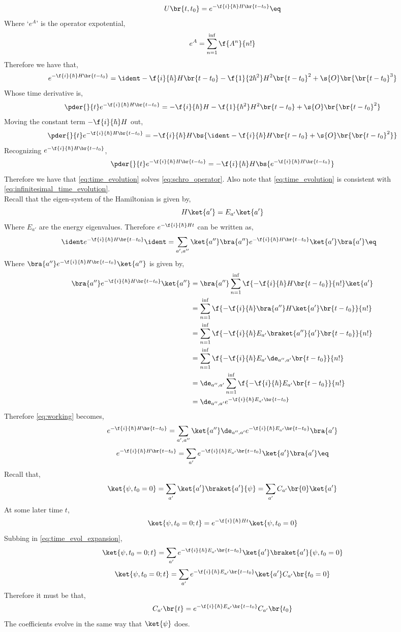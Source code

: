 \documentclass{article}
\begin{document}
\[ U \br{t, t_0} = e^{-\f{i}{\hbar} H\br{t - t_0}} \eq \label{eq:time_evolution}\]
Where `$e^A$' is the operator expotential,
\[ e^{A} = \sum_{n=1}^{\inf} \f{A^n}{n!} \]
Therefore we have that,
\[ e^{-\f{i}{\hbar} H\br{t - t_0}} = \ident -\f{i}{\hbar} H\br{t - t_0} -\f{1}{2\hbar^2} H^2\br{t - t_0}^2 + \s{O}\br{\br{t-t_0}^{3}}\]
Whose time derivative is,
\[ \pder{}{t}e^{-\f{i}{\hbar} H\br{t - t_0}} = -\f{i}{\hbar} H -\f{1}{\hbar^2} H^2\br{t - t_0} + \s{O}\br{\br{t-t_0}^{2}}\]
Moving the constant term $- \f{i}{\hbar} H$ out,
\[ \pder{}{t}e^{-\f{i}{\hbar} H\br{t - t_0}} =  - \f{i}{\hbar} H \bs{\ident -\f{i}{\hbar} H \br{t -t_0} + \s{O}\br{\br{t-t_0}^{2}}}\]
Recognizing $e^{-\f{i}{\hbar} H\br{t - t_0}}$,
\[ \pder{}{t}e^{-\f{i}{\hbar} H\br{t - t_0}} =  - \f{i}{\hbar} H \bs{e^{-\f{i}{\hbar} H\br{t - t_0}}}\]
Therefore we have that \cref{eq:time_evolution} solves \cref{eq:schro_operator}. Also note that \cref{eq:time_evolution} is consistent with \cref{eq:infinitesimal_time_evolution}. \\

Recall that the eigen-system of the Hamiltonian is given by,
\[ H \ket{a'} = E_{a'} \ket{a'} \]
Where $E_{a'}$ are the energy eigenvalues. Therefore $e^{- \f{i}{\hbar} H t}$ can be written as,
\begin{align*}
    \ident e^{-\f{i}{\hbar} H\br{t - t_0}} \ident &= \sum_{a', a''} \ket{a''}\bra{a''} e^{-\f{i}{\hbar} H\br{t - t_0}} \ket{a'}\bra{a'} \eq \label{eq:working}
\end{align*}
Where $\bra{a''} e^{-\f{i}{\hbar} H\br{t - t_0}} \ket{a''}$ is given by,
\begin{align*}
    \bra{a''} e^{-\f{i}{\hbar} H\br{t - t_0}} \ket{a''} &= \bra{a''} \sum_{n=1}^{\inf} \f{-\f{i}{\hbar} H\br{t - t_0}}{n!} \ket{a'}\\
    &=  \sum_{n=1}^{\inf} \f{-\f{i}{\hbar} \bra{a''}H\ket{a'}\br{t - t_0}}{n!} \\
    &=  \sum_{n=1}^{\inf} \f{-\f{i}{\hbar} E_{a'}\braket{a''}{a'}\br{t - t_0}}{n!} \\
    &=  \sum_{n=1}^{\inf} \f{-\f{i}{\hbar} E_{a'}\de_{a'',a'}\br{t - t_0}}{n!} \\
    &=  \de_{a'',a'}\sum_{n=1}^{\inf} \f{-\f{i}{\hbar} E_{a'}\br{t - t_0}}{n!} \\
    &=  \de_{a'',a'}e^{-\f{i}{\hbar} E_{a'}\br{t - t_0}}
\end{align*}
Therefore \cref{eq:working} becomes,
\[ e^{-\f{i}{\hbar} H\br{t - t_0}} = \sum_{a', a''} \ket{a''}\de_{a'',a'}e^{-\f{i}{\hbar} E_{a'}\br{t - t_0}}\bra{a'} \]
\[ e^{-\f{i}{\hbar} H\br{t - t_0}} = \sum_{a'}e^{-\f{i}{\hbar} E_{a'}\br{t - t_0}}\ket{a'}\bra{a'} \eq \label{eq:time_evol_expansion}\]
Recall that,
\[ \ket{\psi, t_0 = 0} = \sum_{a'}\ket{a'} \braket{a'}{\psi} = \sum_{a'} C_{a'}\br{0}\ket{a'} \]
At some later time $t$,
\[ \ket{\psi, t_0 = 0; t} = e^{-\f{i}{\hbar} H t} \ket{\psi, t_0 = 0} \]
Subbing in \cref{eq:time_evol_expansion},
\[ \ket{\psi, t_0 = 0; t} = \sum_{a'}e^{-\f{i}{\hbar} E_{a'}\br{t - t_0}}\ket{a'}\braket{a'}{\psi, t_0 = 0}  \]
\[ \ket{\psi, t_0 = 0; t} = \sum_{a'}e^{-\f{i}{\hbar} E_{a'}\br{t - t_0}}\ket{a'}C_{a'}\br{t_0 = 0} \]
Therefore it must be that,
\[ C_{a'}\br{t} = e^{-\f{i}{\hbar} E_{a'}\br{t - t_0}} C_{a'}\br{t_0} \]
The coefficients evolve in the same way that $\ket{\psi}$ does.
\end{document}

